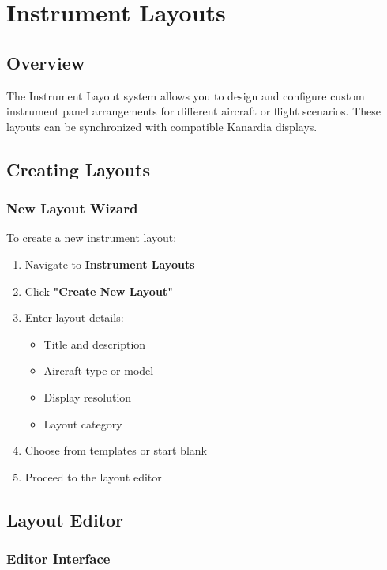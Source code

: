 \chapter{Instrument Layouts}

\section{Overview}

The Instrument Layout system allows you to design and configure custom instrument panel arrangements for different aircraft or flight scenarios. These layouts can be synchronized with compatible Kanardia displays.

\section{Creating Layouts}

\subsection{New Layout Wizard}

To create a new instrument layout:

\begin{enumerate}
    \item Navigate to \textbf{Instrument Layouts}
    \item Click \textbf{"Create New Layout"}
    \item Enter layout details:
    \begin{itemize}
        \item Title and description
        \item Aircraft type or model
        \item Display resolution
        \item Layout category
    \end{itemize}
    \item Choose from templates or start blank
    \item Proceed to the layout editor
\end{enumerate}

\section{Layout Editor}

\subsection{Editor Interface}

